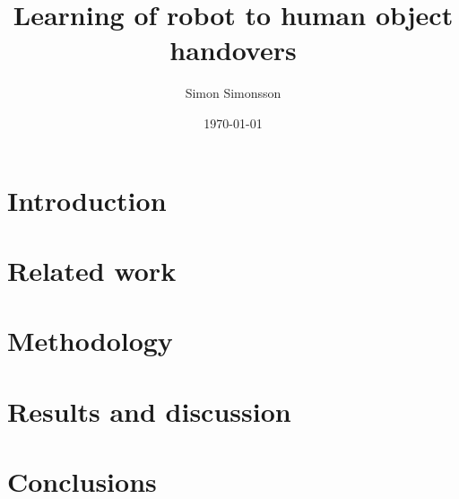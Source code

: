 \documentclass{kththesis}
\title{Learning of robot to human object handovers}
\author{Simon Simonsson}
\date{\today}
\begin{document}
\frontmatter %
\titlepage

\begin{abstract}
	
\end{abstract}

\begin{otherlanguage}{swedish}
	\begin{abstract}
		
	\end{abstract}
\end{otherlanguage}

\tableofcontents

\mainmatter %

\chapter{Introduction}


\chapter{Related work}


\chapter{Methodology}


\chapter{Results and discussion}


\chapter{Conclusions}


\printbibliography[heading=bibintoc] %

\appendix

\end{document}
